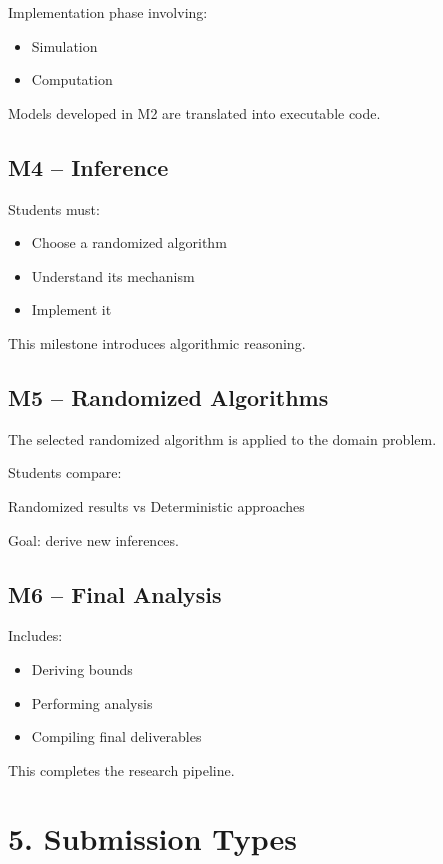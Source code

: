 \documentclass[11pt]{article}
\begin{document}
Implementation phase involving:

\begin{itemize}
\item Simulation
\item Computation
\end{itemize}

Models developed in M2 are translated into executable code.

\subsection*{M4 – Inference}

Students must:

\begin{itemize}
\item Choose a randomized algorithm
\item Understand its mechanism
\item Implement it
\end{itemize}

This milestone introduces algorithmic reasoning.

\subsection*{M5 – Randomized Algorithms}

The selected randomized algorithm is applied to the domain problem.

Students compare:

Randomized results vs Deterministic approaches

Goal: derive new inferences.

\subsection*{M6 – Final Analysis}

Includes:

\begin{itemize}
\item Deriving bounds
\item Performing analysis
\item Compiling final deliverables
\end{itemize}

This completes the research pipeline.

\section*{5. Submission Types}
\end{document}
